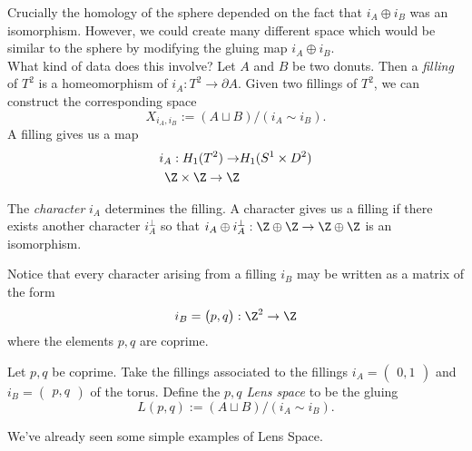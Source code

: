 Crucially the homology of the sphere depended on the fact that $i_A\oplus i_B$ was an isomorphism. However, we could create many different space which would be similar to the sphere by modifying the gluing map $i_A\oplus i_B$. \\
What kind of data does this involve? Let $A$ and $B$ be two donuts. Then a \emph{filling} of $T^2$ is a homeomorphism of $i_A: T^2\to \partial A$. Given two fillings of $T^2$, we can construct the corresponding space 
\[X_{i_A, i_B}:=( A\sqcup B)/(i_A\sim i_B).\]
A filling gives us a map 
\begin{align*}i_A: H_1(T^2)\to&  H_1(S^1\times D^2)\\ \Z\times \Z\to \Z\end{align*}
\begin{claim}
The \emph{character} $i_A$ determines the filling. A character gives us a filling if there exists another character $i_{A}^\bot$ so that $i_{A}\oplus i_{A}^\bot :\Z\oplus \Z\to \Z\oplus \Z $ is an isomorphism.
\end{claim}
Notice that every character arising from a filling $i_B$ may be written as a  matrix of the form 
\[i_B = \begin{pmatrix} p, q \end{pmatrix}: \Z^2\to \Z\]
where the elements $p, q$ are coprime. 
\begin{definition}
Let $p, q$ be coprime. Take the fillings associated to the fillings  $i_A=\begin{pmatrix} 0, 1 \end{pmatrix}$ and $i_B=\begin{pmatrix} p, q\end{pmatrix}$ of the torus. Define the \emph{$p, q$ Lens space} to be the gluing
\[L(p,q):=( A\sqcup B)/(i_A\sim i_B).\]
\end{definition}
We've already seen some simple examples of Lens Space.
\begin{example}[3-sphere]
\end{example}
\begin{example}[$S^2\times S^1$]
\end{example}
\begin{example}[$\RP^3$]
\end{example}

